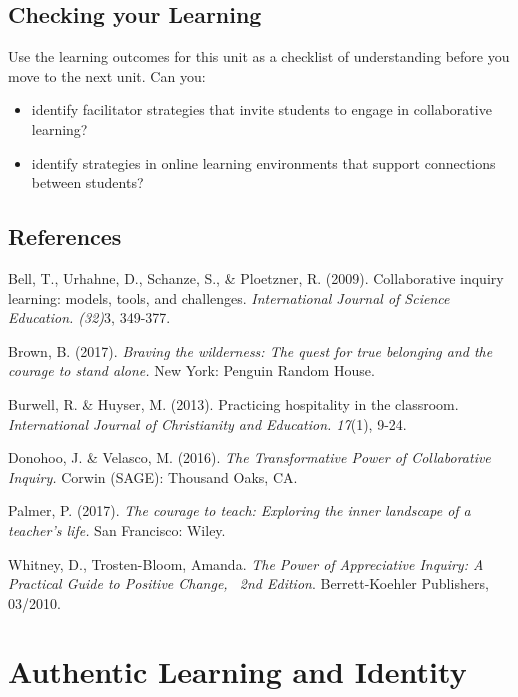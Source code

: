 \documentclass[
]{book}
\providecommand{\tightlist}{%
  \setlength{\itemsep}{0pt}\setlength{\parskip}{0pt}}
\begin{document}
\hypertarget{checking-your-learning-4}{%
\section*{Checking your Learning}\label{checking-your-learning-4}}

\begin{progress}
Use the learning outcomes for this unit as a checklist of understanding
before you move to the next unit. Can you:

\begin{itemize}
\tightlist
\item
  identify facilitator strategies that invite students to engage in
  collaborative learning?
\item
  identify strategies in online learning environments that support
  connections between students?
\end{itemize}
\end{progress}

\hypertarget{references-2}{%
\section*{References}\label{references-2}}

Bell, T., Urhahne, D., Schanze, S., \& Ploetzner, R. (2009). Collaborative inquiry learning: models, tools, and challenges. \emph{International Journal of Science Education. (32)}3, 349-377.

Brown, B. (2017). \emph{Braving the wilderness: The quest for true belonging and the courage to stand alone.} New York: Penguin Random House.

Burwell, R. \& Huyser, M. (2013). Practicing hospitality in the classroom. \emph{International Journal of Christianity and Education. 17}(1), 9-24.

Donohoo, J. \& Velasco, M. (2016). \emph{The Transformative Power of Collaborative Inquiry.} Corwin (SAGE): Thousand Oaks, CA.

Palmer, P. (2017). \emph{The courage to teach: Exploring the inner landscape of a teacher's life.} San Francisco: Wiley.

Whitney, D., Trosten-Bloom, Amanda. \emph{The Power of Appreciative Inquiry: A Practical Guide to Positive Change,~ 2nd Edition}. Berrett-Koehler Publishers, 03/2010.

\hypertarget{authentic-learning-and-identity}{%
\chapter{Authentic Learning and Identity}\label{authentic-learning-and-identity}}
\end{document}
